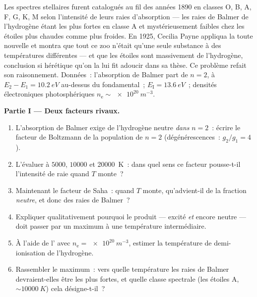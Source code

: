 \begin{problem}\label{pb:b3:grand-canonical:1}
Les spectres stellaires furent catalogués au fil des années 1890 en
classes O, B, A, F, G, K, M selon l'intensité de leurs raies
d'absorption --- les raies de Balmer de l'hydrogène étant les plus
fortes en classe A et mystérieusement faibles chez les étoiles plus
chaudes comme plus froides. En 1925, Cecilia Payne appliqua la toute
nouvelle  et montra que tout ce zoo n'était qu'une
seule substance à des températures différentes --- et que les étoiles
sont massivement de l'hydrogène, conclusion si hérétique qu'on la lui
fit adoucir dans sa thèse. Ce problème refait son raisonnement.
Données~: l'absorption de Balmer part de $n = 2$, à $E_2 - E_1 =
\qty{10.2}{eV}$ au-dessus du fondamental~; $E_{\text{I}} =
\qty{13.6}{eV}$~; densités électroniques photosphériques $n_{\text{e}}
\sim \qty{e20}{m^{-3}}$.

\medskip\noindent\textbf{Partie I --- Deux facteurs rivaux.}
\begin{enumerate}
  \item L'absorption de Balmer exige de l'hydrogène neutre \emph{dans} $n =
        2$~: écrire le facteur de Boltzmann de la population de $n = 2$
        (dégénérescences~: $g_2/g_1 = 4$).
  \item L'évaluer à $5000$, $10000$ et \qty{20000}{K}~: dans quel
        sens ce facteur pousse-t-il l'intensité de raie quand $T$
        monte~?
  \item Maintenant le facteur de Saha~: quand $T$ monte, qu'advient-il
        de la fraction \emph{neutre}, et donc des raies de Balmer~?
  \item Expliquer qualitativement pourquoi le produit --- excité
        \emph{et} encore neutre --- doit passer par un maximum à une
        température intermédiaire.
  \item À l'aide de l' avec $n_{\text{e}} =
        \qty{e20}{m^{-3}}$, estimer la température de demi-ionisation
        de l'hydrogène.
  \item Rassembler le maximum~: vers quelle température les raies de
        Balmer devraient-elles être les plus fortes, et quelle classe
        spectrale (les étoiles A, $\sim\qty{10000}{K}$) cela
        désigne-t-il~?
\end{enumerate}


\end{problem}
